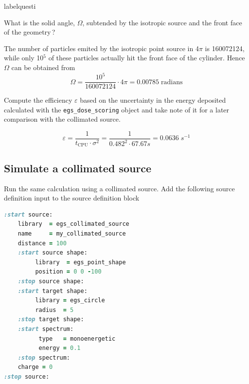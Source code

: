 \documentclass[12pt,twoside]{article}
\makeatletter
\renewcommand\thequesti         {\@arabic\c@questi}
\newenvironment{question}{
    \bfseries
    \edef\@questictr{questi}
    \expandafter
    \list \csname label\@questictr\endcsname {
        \usecounter\@questictr\def\makelabel##1{\hss\llap{##1}}
        \savebox{\questbox}             {\thequesti}
        \setlength\labelsep             {0.6em}
        \setlength\labelwidth           {\wd\questbox}
        \setlength\leftmargini          {\labelwidth}
        \addtolength{\leftmargini}      {\labelsep}
        \addtolength{\leftmargini}      {0.2em}
        \leftmargin\leftmargini
        \setlength\topsep               {1em}
        \setlength\itemsep              {1.2em}
        \setlength\parsep               {0.5em}
    }
}{\normalfont\endlist}
\newenvironment{answer}{\normalfont}{\relax}
\makeatother
\begin{document}
\begin{question}
\begin{answer}
\end{answer}

\item What is the solid angle, $\Omega$, subtended by the isotropic source and
the front face of the geometry\,?

\begin{answer}
The number of particles emited by the isotropic point source in 4$\pi$ is
160072124, while only 10$^5$ of these particles actually hit the front face of
the cylinder. Hence $\Omega$ can be obtained from
\begin{equation*}
 \Omega = \frac{10^5}{160072124}\cdot 4\pi = 0.00785\; \mathrm{radians}
\end{equation*}

\end{answer}

\item Compute the efficiency $\varepsilon$ based on the uncertainty in the
energy deposited calculated with the \Verb+egs_dose_scoring+ object
and take note of it for a later comparison with the collimated source.

\begin{answer}
\begin{equation*}
\varepsilon = \frac{1}{t_\mathrm{CPU}\cdot \sigma^2} = \frac{1}{0.482^2 \cdot
67.67 s} = 0.0636\; s^{-1}
\end{equation*}
\end{answer}

\end{question}

\subsection{Simulate a collimated source}

Run the same calculation using a collimated source. Add the following source
definition input to the source definition block


{\renewcommand\baselinestretch{1}
\begin{lstlisting}[language=ruby,backgroundcolor=\color{white}]
:start source:
    library  = egs_collimated_source
    name     = my_collimated_source
    distance = 100
    :start source shape:
         library  = egs_point_shape
         position = 0 0 -100
    :stop source shape:
    :start target shape:
         library = egs_circle
         radius  = 5
    :stop target shape:
    :start spectrum:
          type   = monoenergetic
          energy = 0.1
    :stop spectrum:
    charge = 0
:stop source:
\end{lstlisting}
}
\end{document}
